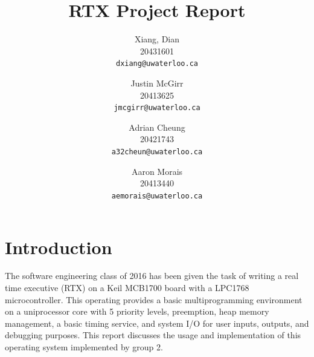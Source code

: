 \documentclass[12pt]{report}
\begin{document}

\title{RTX Project Report}

\author{
    Xiang, Dian\\
    20431601\\
    \texttt{dxiang@uwaterloo.ca}
    \and
    Justin McGirr\\
    20413625\\
    \texttt{jmcgirr@uwaterloo.ca}
    \and
    Adrian Cheung\\
    20421743\\
    \texttt{a32cheun@uwaterloo.ca}
    \and
    Aaron Morais\\
    20413440\\
    \texttt{aemorais@uwaterloo.ca}
}

\maketitle

\begin{abstract}
\end{abstract}

\tableofcontents
\listofalgorithms
\listoffigures



\part{Introduction}
The software engineering class of 2016 has been given the task of writing a real time executive (RTX) on a Keil MCB1700 board with a LPC1768 microcontroller. This operating provides a basic multiprogramming environment on a uniprocessor core with 5 priority levels, preemption, heap memory management, a basic timing service, and system I/O for user inputs, outputs, and debugging purposes. This report discusses the usage and implementation of this operating system implemented by group 2.
\end{document}
